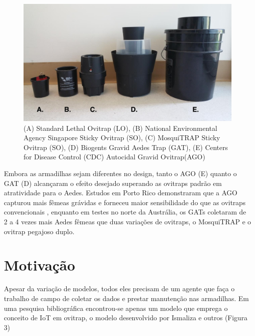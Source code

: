 \documentclass[
	12pt,				%
	openright,			%
	oneside,			%
	a4paper,			%
	chapter=TITLE,		%
	english,			%
	brazil				%
	]{abntex2}
\begin{document}
\begin{figure}[h!]
\centering
\includegraphics[scale=0.3]{imagens/exemplosovitraps.png}
 \caption{(A) Standard Lethal Ovitrap (LO), (B) National Environmental Agency Singapore Sticky Ovitrap (SO), (C) MosquiTRAP 
 Sticky Ovitrap (SO), (D) Biogents Gravid Aedes Trap (GAT), (E) Centers for Disease Control (CDC) Autocidal Gravid Ovitrap(AGO)}
    \label{fig:evolucaoOvitraps}
\end{figure}

Embora as armadilhas sejam diferentes no design, tanto o AGO (E) quanto o GAT (D)
alcançaram o efeito desejado superando as ovitraps padrão em atratividade para o Aedes.
Estudos em Porto Rico demonstraram que a AGO capturou mais fêmeas grávidas e
forneceu maior sensibilidade do que as ovitraps convencionais \cite{BRIANJJOHNSON2017}, enquanto em testes no norte da 
Austrália, os GATs coletaram de 2 a 4 vezes mais Aedes fêmeas que
duas variações de ovitraps, o MosquiTRAP e o ovitrap pegajoso duplo. 

\section{Motivação}
Apesar da variação de modelos, todos eles precisam de um agente que faça o trabalho de
campo de coletar os dados e prestar manutenção nas armadilhas. Em uma pesquisa
bibliográfica encontrou-se apenas um modelo que emprega o conceito de IoT em ovitrap, o modelo desenvolvido por Ismaliza e outros \cite{ISMALIZA2019} (Figura 3)
\end{document}
